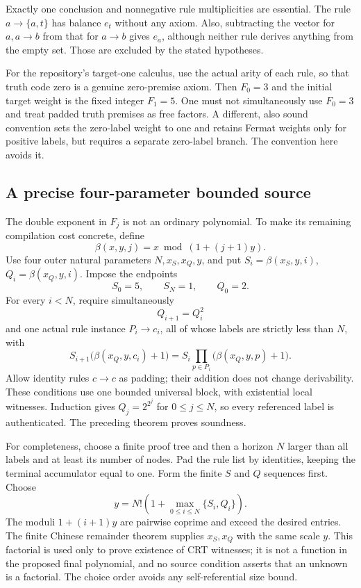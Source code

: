 Exactly one conclusion and nonnegative rule multiplicities are essential.
The rule $a\longrightarrow\{a,t\}$ has balance $e_t$ without any axiom.
Also, subtracting the vector for $a,a\longrightarrow b$ from that for
$a\longrightarrow b$ gives $e_a$, although neither rule derives anything
from the empty set. Those are excluded by the stated hypotheses.

For the repository's target-one calculus, use the actual arity of each
rule, so that truth code zero is a genuine zero-premise axiom. Then
$F_0=3$ and the initial target weight is the fixed integer $F_1=5$.
One must not simultaneously use $F_0=3$ and treat padded truth premises
as free factors. A different, also sound convention sets the zero-label
weight to one and retains Fermat weights only for positive labels, but
requires a separate zero-label branch. The convention here avoids it.

\subsection{A precise four-parameter bounded source}

The double exponent in $F_j$ is not an ordinary polynomial. To make its
remaining compilation cost concrete, define
\[
 \beta(x,y,j)=x\bmod(1+(j+1)y).
\]
Use four outer natural parameters $N,x_S,x_Q,y$, and put
$S_i=\beta(x_S,y,i)$, $Q_i=\beta(x_Q,y,i)$.
Impose the endpoints
\[
 S_0=5,\qquad S_N=1,\qquad Q_0=2.
\]
For every $i<N$, require simultaneously
\[
 Q_{i+1}=Q_i^2
\]
and one actual rule instance $P_i\longrightarrow c_i$, all of whose
labels are strictly less than $N$, with
\[
 S_{i+1}\bigl(\beta(x_Q,y,c_i)+1\bigr)
   =S_i\prod_{p\in P_i}\bigl(\beta(x_Q,y,p)+1\bigr).
\]
Allow identity rules $c\longrightarrow c$ as padding; their addition
does not change derivability. These conditions use one bounded universal
block, with existential local witnesses. Induction gives
$Q_j=2^{2^j}$ for $0\le j\le N$, so every referenced label is authenticated.
The preceding theorem proves soundness.

For completeness, choose a finite proof tree and then a horizon $N$
larger than all labels and at least its number of nodes. Pad the rule list
by identities, keeping the terminal accumulator equal to one. Form the
finite $S$ and $Q$ sequences first. Choose
\[
 y=N!\left(1+\max_{0\le i\le N}\{S_i,Q_i\}\right).
\]
The moduli $1+(i+1)y$ are pairwise coprime and exceed the desired entries.
The finite Chinese remainder theorem supplies $x_S,x_Q$ with the same
scale $y$. This factorial is used only to prove existence of CRT witnesses;
it is not a function in the proposed final polynomial, and no source
condition asserts that an unknown is a factorial. The choice order avoids
any self-referential size bound.

